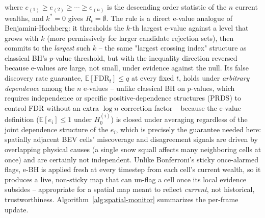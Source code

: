 where $e_{(1)} \ge e_{(2)} \ge \cdots \ge e_{(n)}$ is the descending order statistic of the $n$ current wealths, and $k^\ast = 0$ gives $R_t = \emptyset$. The rule is a direct e-value analogue of Benjamini-Hochberg: it thresholds the $k$-th largest e-value against a level that grows with $k$ (more permissively for larger candidate rejection sets), then commits to the \emph{largest} such $k$ -- the same "largest crossing index" structure as classical BH's $p$-value threshold, but with the inequality direction reversed because e-values are large, not small, under evidence against the null. Its false discovery rate guarantee, $\mathbb{E}[\mathrm{FDR}_t] \le q$ at every fixed $t$, holds under \emph{arbitrary dependence} among the $n$ e-values -- unlike classical BH on $p$-values, which requires independence or specific positive-dependence structures (PRDS) to control FDR without an extra $\log n$ correction factor -- because the e-value definition ($\mathbb{E}[e_i] \le 1$ under $H_0^{(i)}$) is closed under averaging regardless of the joint dependence structure of the $e_i$, which is precisely the guarantee needed here: spatially adjacent BEV cells' miscoverage and disagreement signals are driven by overlapping physical causes (a single snow squall affects many neighboring cells at once) and are certainly not independent. Unlike Bonferroni's sticky once-alarmed flags, e-BH is applied fresh at every timestep from each cell's current wealth, so it produces a live, non-sticky map that can un-flag a cell once its local evidence subsides -- appropriate for a spatial map meant to reflect \emph{current}, not historical, trustworthiness. Algorithm~\ref{alg:spatial-monitor} summarizes the per-frame update.

